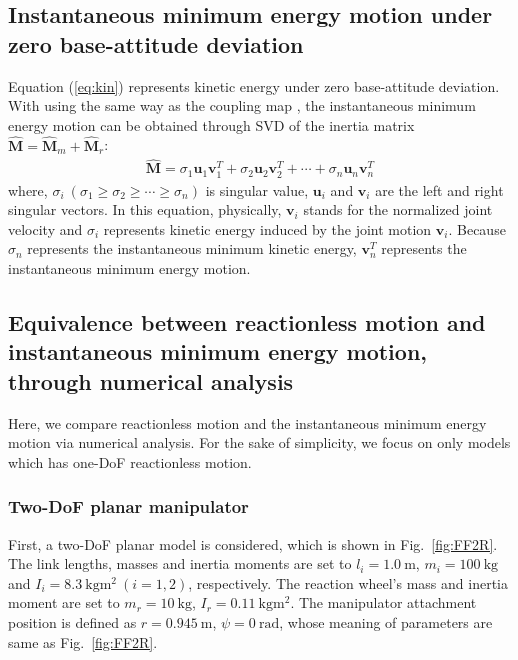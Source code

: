 \documentclass[preprint,12pt]{elsarticle}
\def\fig#1{{Fig.~\ref{fig:#1}}}
\def\eq#1{{(\ref{eq:#1})}}
\def\unit#1{{~\mathrm{#1}}}
\begin{document}
\subsection{Instantaneous minimum energy motion under zero base-attitude deviation}
Equation \eq{kin} represents kinetic energy under zero base-attitude deviation.
With using the same way as the coupling map \cite{Torres1993},
the instantaneous minimum energy motion can be obtained through SVD of
the inertia matrix $\hat{\bm{M}} = \hat{\bm{M}}_{m} + \hat{\bm{M}}_{r}$:
%
\begin{align}
  \hat{\bm{M}} = \sigma_{1}\bm{u}_{1}\bm{v}_{1}^{T} + \sigma_{2}\bm{u}_{2}\bm{v}_{2}^{T} + \cdots + \sigma_{n}\bm{u}_{n}\bm{v}_{n}^{T}
  \label{eq:svd}
\end{align}
%
where, $\sigma_{i}~(\sigma_{1} \geq \sigma_{2} \geq \cdots \geq \sigma_{n})$ is singular value,
$\bm{u}_{i}$ and $\bm{v}_{i}$ are the left and right singular vectors.
In this equation,
physically, $\bm{v}_{i}$ stands for the normalized joint velocity and
$\sigma_{i}$ represents kinetic energy induced by the joint motion $\bm{v}_{i}$.
Because $\sigma_{n}$ represents the instantaneous minimum kinetic energy,
$\bm{v}_{n}^{T}$ represents the instantaneous minimum energy motion.



\subsection{Equivalence between reactionless motion and 
instantaneous minimum energy motion, through numerical analysis}
Here, we compare reactionless motion and the instantaneous minimum energy motion via numerical analysis.
For the sake of simplicity,
we focus on only models which has one-DoF reactionless motion.


\subsubsection{Two-DoF planar manipulator}
First,
a two-DoF planar model is considered, which is shown in \fig{FF2R}.
The link lengths, masses and inertia moments are set to $l_{i} = 1.0\unit{m}$,
$m_{i} = 100\unit{kg}$ and $I_{i} = 8.3\unit{kgm^{2}}~(i=1,2)$, respectively.
The reaction wheel's mass and inertia moment are set to $m_{r} = 10\unit{kg}$,
$I_{r} = 0.11\unit{kgm^{2}}$.
The manipulator attachment position is defined as $r = 0.945\unit{m}$, $\psi = 0\unit{rad}$,
whose meaning of parameters are same as \fig{FF2R}.
\end{document}

